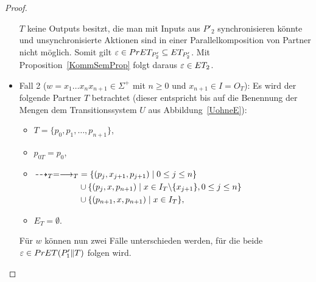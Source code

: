 \begin{proof}
\begin{itemize}
      $T$ keine Outputs besitzt, die man mit Inputs aus $P'_2$ synchronisieren
      könnte und unsynchronisierte Aktionen sind in einer Parallelkomposition
      von Partner nicht möglich. Somit gilt $\varepsilon\in PrET
      _{P'_2}\subseteq ET _{P'_2}$. Mit Proposition~\ref{KommSemProp} folgt
      daraus $\varepsilon\in ET _2$.
    \item Fall 2 ($w=x_1\dots x_n x_{n+1}\in\Sigma ^+$ mit $n\geq 0$ und
      $x_{n+1}\in I=O_T$): Es wird der folgende Partner $T$ betrachtet (dieser
      entspricht bis auf die Benennung der Mengen dem Transitionssystem $U$
      aus Abbildung~\ref{UohneE}):
      \begin{itemize}
        \item $T=\{p_0,p_1,\dots ,p_{n+1}\}$,
        \item $p_{0T}=p_0$,
        \item $\begin{aligned}[t]
            \may _T = \must _T&=\{(p_j,x_{j+1},p_{j+1})\mid  0\leq j\leq n\}\\
            &\cup\{(p_j,x,p_{n+1})\mid  x\in I_T\backslash\{x_{j+1}\}, 0\leq
            j\leq n\}\\
            &\cup\{(p_{n+1},x,p_{n+1})\mid  x\in I_T\},
        \end{aligned}$
        \item $E_T=\emptyset$.
      \end{itemize}
      Für $w$ können nun zwei Fälle unterschieden werden, für die beide
      $\varepsilon\in PrET (P'_1\|T)$ folgen wird.
\end{itemize}
\end{proof}
